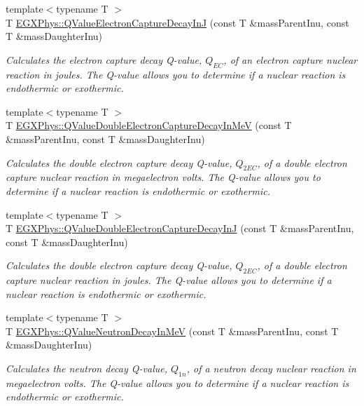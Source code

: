 \begin{DoxyCompactItemize}
{\footnotesize template$<$typename T $>$ }\\T \hyperlink{group___e_g_x_phys-_q_value_ga7b523a7d197beb91dcda75ddde12c851}{E\+G\+X\+Phys\+::\+Q\+Value\+Electron\+Capture\+Decay\+InJ} (const T \&mass\+Parent\+Inu, const T \&mass\+Daughter\+Inu)
\begin{DoxyCompactList}\small\item\em Calculates the electron capture decay Q-\/value, $Q_{EC}$, of an electron capture nuclear reaction in joules. The Q-\/value allows you to determine if a nuclear reaction is endothermic or exothermic. \end{DoxyCompactList}\item 
{\footnotesize template$<$typename T $>$ }\\T \hyperlink{group___e_g_x_phys-_q_value_ga93e5774784c0d9551e46ba19e1dbc9ab}{E\+G\+X\+Phys\+::\+Q\+Value\+Double\+Electron\+Capture\+Decay\+In\+MeV} (const T \&mass\+Parent\+Inu, const T \&mass\+Daughter\+Inu)
\begin{DoxyCompactList}\small\item\em Calculates the double electron capture decay Q-\/value, $Q_{2EC}$, of a double electron capture nuclear reaction in megaelectron volts. The Q-\/value allows you to determine if a nuclear reaction is endothermic or exothermic. \end{DoxyCompactList}\item 
{\footnotesize template$<$typename T $>$ }\\T \hyperlink{group___e_g_x_phys-_q_value_gae25e179b76580bc6af7fa4bdf938ba4e}{E\+G\+X\+Phys\+::\+Q\+Value\+Double\+Electron\+Capture\+Decay\+InJ} (const T \&mass\+Parent\+Inu, const T \&mass\+Daughter\+Inu)
\begin{DoxyCompactList}\small\item\em Calculates the double electron capture decay Q-\/value, $Q_{2EC}$, of a double electron capture nuclear reaction in joules. The Q-\/value allows you to determine if a nuclear reaction is endothermic or exothermic. \end{DoxyCompactList}\item 
{\footnotesize template$<$typename T $>$ }\\T \hyperlink{group___e_g_x_phys-_q_value_gaf854b3ac07909a87f44be4e38ebb0c32}{E\+G\+X\+Phys\+::\+Q\+Value\+Neutron\+Decay\+In\+MeV} (const T \&mass\+Parent\+Inu, const T \&mass\+Daughter\+Inu)
\begin{DoxyCompactList}\small\item\em Calculates the neutron decay Q-\/value, $Q_{1n}$, of a neutron decay nuclear reaction in megaelectron volts. The Q-\/value allows you to determine if a nuclear reaction is endothermic or exothermic. \end{DoxyCompactList}\item 

\end{DoxyCompactItemize}
